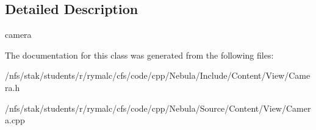\subsection{Detailed Description}
camera 

The documentation for this class was generated from the following files:\begin{DoxyCompactItemize}
\item 
/nfs/stak/students/r/rymalc/cfs/code/cpp/Nebula/Include/Content/View/Camera.h\item 
/nfs/stak/students/r/rymalc/cfs/code/cpp/Nebula/Source/Content/View/Camera.cpp\end{DoxyCompactItemize}
